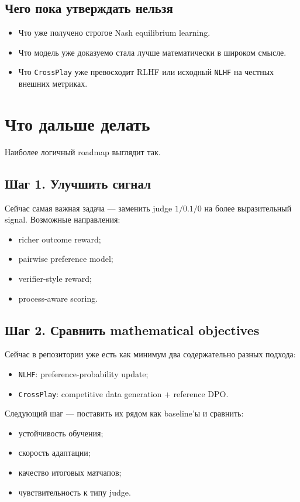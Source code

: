 \documentclass[11pt,a4paper]{article}
\begin{document}
\subsection{Чего пока утверждать нельзя}

\begin{itemize}
  \item Что уже получено строгое Nash equilibrium learning.
  \item Что модель уже доказуемо стала лучше математически в широком смысле.
  \item Что \texttt{CrossPlay} уже превосходит RLHF или исходный \texttt{NLHF} на честных внешних метриках.
\end{itemize}

\section{Что дальше делать}

Наиболее логичный roadmap выглядит так.

\subsection{Шаг 1. Улучшить сигнал}

Сейчас самая важная задача --- заменить judge $1/0.1/0$ на более выразительный signal. Возможные направления:
\begin{itemize}
  \item richer outcome reward;
  \item pairwise preference model;
  \item verifier-style reward;
  \item process-aware scoring.
\end{itemize}

\subsection{Шаг 2. Сравнить mathematical objectives}

Сейчас в репозитории уже есть как минимум два содержательно разных подхода:
\begin{itemize}
  \item \texttt{NLHF}: preference-probability update;
  \item \texttt{CrossPlay}: competitive data generation + reference DPO.
\end{itemize}

Следующий шаг --- поставить их рядом как baseline'ы и сравнить:
\begin{itemize}
  \item устойчивость обучения;
  \item скорость адаптации;
  \item качество итоговых матчапов;
  \item чувствительность к типу judge.
\end{itemize}
\end{document}
